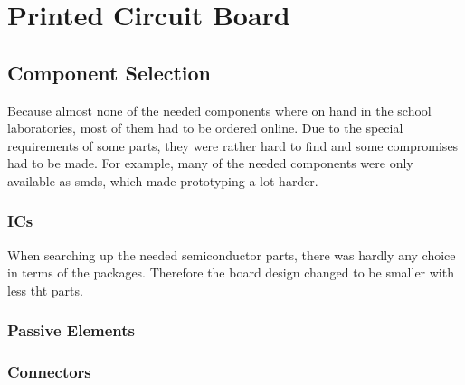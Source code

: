 \chapter{Printed Circuit Board}


\section{Component Selection}

Because almost none of the needed components where on hand in the school laboratories, most of them had to be ordered online. Due to the special requirements of some parts, they were rather hard to find and some compromises had to be made.
For example, many of the needed components were only available as \glspl{smd}, %
which made prototyping a lot harder.

\subsection{ICs}

When searching up the needed semiconductor parts, there was hardly any choice in terms of the packages. Therefore the board design changed to be smaller with less \gls{tht} parts. 

\subsection{Passive Elements}



\subsection{Connectors}




